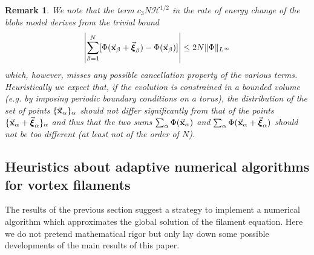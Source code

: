 \documentclass[a4paper,11pt]{article}
\numberwithin{equation}{section}
\newtheorem{remark}{Remark}
\newcommand{\x}{\mbox{$\vec{\bf x}$}}
\newcommand{\bxi}{\mbox{$\vec{\boldsymbol \xi}$}}
\begin{document}
\vspace{.2cm}
%
\begin{remark}
We note that the term $c_3 N \mathcal{H}^{1/2}$ in the rate of energy 
change of the blobs model derives from the trivial bound
$$
\left|\sum_{\beta=1}^N
	  [\Phi(\x_{\beta}+\bxi_\beta)-\Phi(\x_\beta)]\right| \le 
2 N \|\Phi\|_{L^\infty}
$$ 
which, however, misses any possible cancellation property of the various
terms. Heuristically we expect that, if the evolution is constrained in
a bounded volume (e.g. by imposing periodic boundary conditions on a
torus), the distribution of the set of points $\{\x_\alpha\}_\alpha$
should not differ significantly from that of the points
$\{\x_\alpha+\bxi_\alpha\}_\alpha$ and thus that the two sums
$\sum_\alpha \Phi(\x_\alpha)$ and $\sum_\alpha
\Phi(\x_\alpha+\bxi_\alpha)$ should not be too different (at least not
of the order of $N$). 
\end{remark}

%
\subsection{Heuristics about adaptive numerical algorithms for vortex filaments}
The results of the previous section suggest a strategy to implement a
numerical algorithm which approximates the global solution of the
filament equation. Here we do not pretend mathematical rigor but only lay down some possible developments of the main results of this paper.
\end{document}
